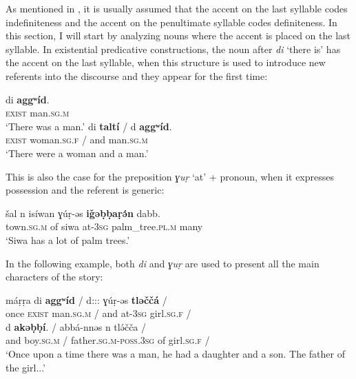 \documentclass[output=paper]{langsci/langscibook}
\begin{document}
As mentioned in , it is usually assumed that the accent on the last syllable codes indefiniteness and the accent on the penultimate syllable codes definiteness. In this section, I will start by analyzing nouns where the accent is placed on the last syllable. In existential predicative constructions, the noun after {\emph{di}} `there is' has the accent on the last syllable, when this structure is used to introduce new referents into the discourse and they appear for the first time:

\begin{exe}
\ex\label{5ex:6}
\gll	di			{\textbf{aggʷíd}}. \\
	{\textsc{exist}}		man.{\textsc{sg.m}} \\
\glt	`There was a man.'
\ex\label{5ex:7}
\gll	di			{\textbf{taltí}}		/	d	{\textbf{aggʷíd}}. \\
	{\textsc{exist}}	woman.{\textsc{sg.f}}	/	and	man.{\textsc{sg.m}} \\
\glt	`There were a woman and a man.'
\end{exe}

This is also the case for the preposition {\emph{ɣuṛ}} `at' + pronoun, when it expresses possession and the referent is generic:

\begin{exe}
\ex\label{5ex:8}
\gll	šal n isíwan ɣúṛ-əs {\textbf{iǧəḅḅaṛə́n}} dabb. \\
	town.{\textsc{sg.m}} of siwa at-{\textsc{3sg}} palm\_tree.{\textsc{pl.m}} many \\
\glt	`Siwa has a lot of palm trees.'
\end{exe}

In the following example, both {\emph{di}} and {\emph{ɣuṛ}} are used to present all the main characters of the story:

\begin{exe}
\ex\label{5ex:9}
\gll	máṛṛa di {\textbf{aggʷíd}} / d::: ɣúṛ-əs {\textbf{tləččá}} / \\
	once	{\textsc{exist}} man.{\textsc{sg.m}} /	and at-{\textsc{3sg}} girl.{\textsc{sg.f}} / \\
\glt
\exi{}
\gll	d {\textbf{akəḅḅí}}. / abbá-nnəs n tlə́čča / \\
	and boy.{\textsc{sg.m}} / father.{\textsc{sg.m-poss.3sg}} of girl.{\textsc{sg.f}} / \\
\glt	`Once upon a time there was a man, he had a daughter and a son. The father of the girl...'
\end{exe}
\end{document}
